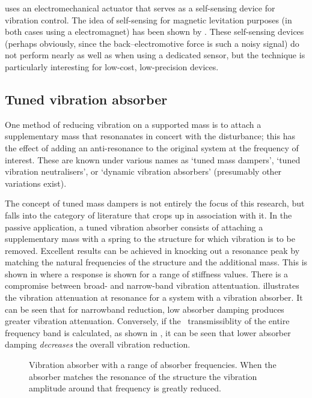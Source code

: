 \textcite{paulitsch2003} uses an electromechanical actuator that serves as a
self-sensing device for vibration control. The idea of self-sensing for
magnetic levitation purposes (in both cases using a electromagnet) has been
shown by \textcite{bleuler1992,vischer1993}. These self-sensing devices
(perhaps obviously, since the back--electromotive force is such a noisy
signal) do not perform nearly as well as when using a dedicated sensor, but
the technique is particularly interesting for low-cost, low-precision devices.





\subsection{Tuned vibration absorber}

One method of reducing vibration on a supported mass is to attach a
supplementary mass that resonanates in concert with the disturbance; this has
the effect of adding an anti-resonance to the original system at the frequency
of interest. These are known under various names as `tuned mass dampers',
`tuned vibration neutralisers', or `dynamic vibration absorbers' (presumably
other variations exist).

The concept of tuned mass dampers is not entirely the focus of this research,
but falls into the category of literature that crops up in association with
it. In the passive application, a tuned vibration absorber consists of
attaching a supplementary mass with a spring to the structure for which
vibration is to be removed. Excellent results can be achieved in knocking out
a resonance peak by matching the natural frequencies of the structure and the
additional mass. This is shown in  where a response
is shown for a range of stiffness values. There is a compromise between broad-
and narrow-band vibration attentuation. 
illustrates the vibration attenuation at resonance for a system with a
vibration absorber. It can be seen that for narrowband reduction, low absorber
damping produces greater vibration attenuation. Conversely, if the \RMS\
transmissiblity of the entire frequency band is calculated, as shown in
\figref{rms-inertial}, it can be seen that lower absorber damping
\emph{decreases} the overall vibration reduction.

\begin{figure}
   \caption{Vibration absorber with a range of absorber frequencies. 
   When the absorber matches the resonance of the structure the vibration 
   amplitude around that frequency is greatly reduced.}
\end{figure}

